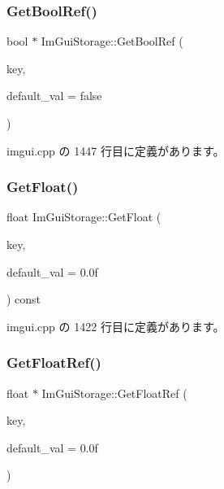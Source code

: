 \subsubsection{\texorpdfstring{Get\+Bool\+Ref()}{GetBoolRef()}}
{\footnotesize\ttfamily bool $\ast$ Im\+Gui\+Storage\+::\+Get\+Bool\+Ref (\begin{DoxyParamCaption}\item[{\mbox{\hyperlink{imgui_8h_a1785c9b6f4e16406764a85f32582236f}{Im\+Gui\+ID}}}]{key,  }\item[{bool}]{default\+\_\+val = {\ttfamily false} }\end{DoxyParamCaption})}



 imgui.\+cpp の 1447 行目に定義があります。

\mbox{\label{struct_im_gui_storage_a0f51ef327f7e548d003b0e006967c1eb}} 
\subsubsection{\texorpdfstring{Get\+Float()}{GetFloat()}}
{\footnotesize\ttfamily float Im\+Gui\+Storage\+::\+Get\+Float (\begin{DoxyParamCaption}\item[{\mbox{\hyperlink{imgui_8h_a1785c9b6f4e16406764a85f32582236f}{Im\+Gui\+ID}}}]{key,  }\item[{float}]{default\+\_\+val = {\ttfamily 0.0f} }\end{DoxyParamCaption}) const}



 imgui.\+cpp の 1422 行目に定義があります。

\mbox{\label{struct_im_gui_storage_a4b51cc8c92c65d4224af65a8ce7752ee}} 
\subsubsection{\texorpdfstring{Get\+Float\+Ref()}{GetFloatRef()}}
{\footnotesize\ttfamily float $\ast$ Im\+Gui\+Storage\+::\+Get\+Float\+Ref (\begin{DoxyParamCaption}\item[{\mbox{\hyperlink{imgui_8h_a1785c9b6f4e16406764a85f32582236f}{Im\+Gui\+ID}}}]{key,  }\item[{float}]{default\+\_\+val = {\ttfamily 0.0f} }\end{DoxyParamCaption})}



